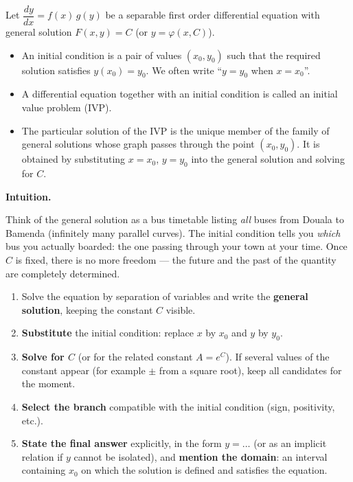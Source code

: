 \documentclass[11pt]{article}
\newcommand{\cle}[1]{{\popxbold\color{popdark}#1}}
\begin{document}
\begin{definition}
Let $\dfrac{dy}{dx}=f(x)\,g(y)$ be a separable first order differential equation with general solution $F(x,y)=C$ (or $y=\varphi(x,C)$).
\begin{itemize}
\item An \cle{initial condition} is a pair of values $(x_0,y_0)$ such that the required solution satisfies $y(x_0)=y_0$. We often write ``$y=y_0$ when $x=x_0$''.
\item A differential equation together with an initial condition is called an \cle{initial value problem} (IVP).
\item The \cle{particular solution} of the IVP is the unique member of the family of general solutions whose graph passes through the point $(x_0,y_0)$. It is obtained by substituting $x=x_0$, $y=y_0$ into the general solution and solving for $C$.
\end{itemize}
\end{definition}

\textbf{Intuition.}\par
Think of the general solution as a bus timetable listing \emph{all} buses from Douala to Bamenda (infinitely many parallel curves). The initial condition tells you \emph{which} bus you actually boarded: the one passing through your town at your time. Once $C$ is fixed, there is no more freedom — the future and the past of the quantity are completely determined.

\begin{methode}
\begin{enumerate}
\item Solve the equation by separation of variables and write the \textbf{general solution}, keeping the constant $C$ visible.
\item \textbf{Substitute} the initial condition: replace $x$ by $x_0$ and $y$ by $y_0$.
\item \textbf{Solve for $C$} (or for the related constant $A=e^{C}$). If several values of the constant appear (for example $\pm$ from a square root), keep all candidates for the moment.
\item \textbf{Select the branch} compatible with the initial condition (sign, positivity, etc.).
\item \textbf{State the final answer} explicitly, in the form $y=\ldots$ (or as an implicit relation if $y$ cannot be isolated), and \textbf{mention the domain}: an interval containing $x_0$ on which the solution is defined and satisfies the equation.
\end{enumerate}
\end{methode}
\end{document}
